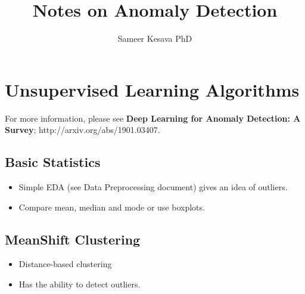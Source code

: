\documentclass[a4paper, 12pt]{report}
\begin{document}
\title{Notes on Anomaly Detection}
\author{Sameer Kesava PhD}
\date{} %
\maketitle

\tableofcontents
\newpage





\chapter{Unsupervised Learning Algorithms}
For more information, please see \textbf{Deep Learning for Anomaly Detection: A Survey}; http://arxiv.org/abs/1901.03407. 

\section{Basic Statistics}
\begin{itemize}
\item Simple EDA (see Data Preprocessing document) gives an idea of outliers.
\item Compare mean, median and mode or use boxplots.
\end{itemize}

\section{MeanShift Clustering}
\begin{itemize}
\item Distance-based clustering
\item Has the ability to detect outliers.
\end{itemize}

\end{document}
